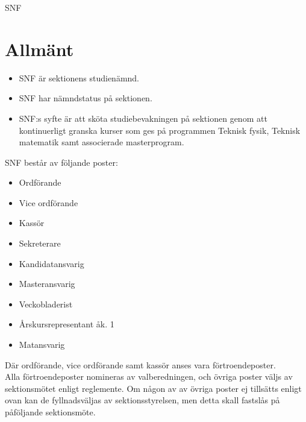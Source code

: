 \documentclass[a4paper]{article}
\begin{document}
\renewcommand{\forening}{SNF} %

\begin{foreningenv}{\forening{}} %
    \section{Allmänt}
    \begin{itemize}
        \item SNF är sektionens studienämnd.
        \item SNF har nämndstatus på sektionen.
        \item SNF:s syfte är att sköta studiebevakningen på sektionen genom att kontinuerligt granska kurser som ges på programmen Teknisk fysik, Teknisk matematik samt associerade masterprogram.
    \end{itemize}
    
    SNF består av följande poster:
    \begin{itemize}
        \item Ordförande
        \item Vice ordförande
        \item Kassör
        \item Sekreterare
        \item Kandidatansvarig
        \item Masteransvarig
        \item Veckobladerist
        \item Årskursrepresentant åk. 1
        \item Matansvarig
    \end{itemize}
    Där ordförande, vice ordförande samt kassör anses vara förtroendeposter. \\
    
    Alla förtroendeposter nomineras av valberedningen, och övriga poster väljs av sektionsmötet enligt reglemente. Om någon av av övriga poster ej tillsätts enligt ovan kan de fyllnadsväljas av sektionsstyrelsen, men detta skall fastslås på påföljande sektionsmöte.
    

\end{foreningenv}
\end{document}
